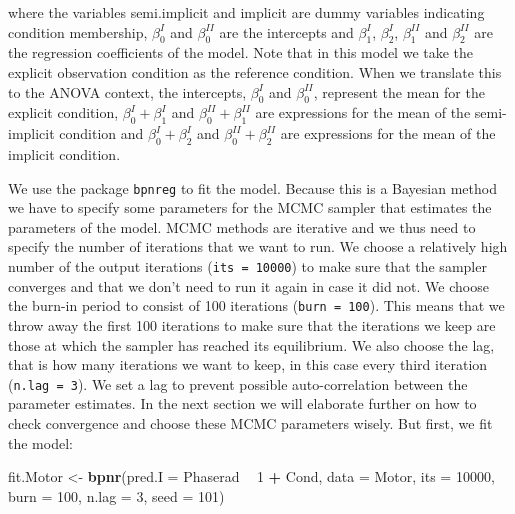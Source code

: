 \documentclass[11pt,]{article}
\newenvironment{Shaded}{\begin{snugshade}}{\end{snugshade}}
\newcommand{\DataTypeTok}[1]{\textcolor[rgb]{0.13,0.29,0.53}{#1}}
\newcommand{\DecValTok}[1]{\textcolor[rgb]{0.00,0.00,0.81}{#1}}
\newcommand{\KeywordTok}[1]{\textcolor[rgb]{0.13,0.29,0.53}{\textbf{#1}}}
\newcommand{\NormalTok}[1]{#1}
\newcommand{\OperatorTok}[1]{\textcolor[rgb]{0.81,0.36,0.00}{\textbf{#1}}}
\newcommand{\StringTok}[1]{\textcolor[rgb]{0.31,0.60,0.02}{#1}}
\begin{document}
where the variables semi.implicit and implicit are dummy variables
indicating condition membership, \(\beta_{0}^{I}\) and
\(\beta_{0}^{II}\) are the intercepts and \(\beta_{1}^{I}\),
\(\beta_{2}^{I}\), \(\beta_{1}^{II}\) and \(\beta_{2}^{II}\) are the
regression coefficients of the model. Note that in this model we take
the explicit observation condition as the reference condition. When we
translate this to the ANOVA context, the intercepts, \(\beta_{0}^{I}\)
and \(\beta_{0}^{II}\), represent the mean for the explicit condition,
\(\beta_{0}^{I} + \beta_{1}^{I}\) and
\(\beta_{0}^{II} + \beta_{1}^{II}\) are expressions for the mean of the
semi-implicit condition and \(\beta_{0}^{I} + \beta_{2}^{I}\) and
\(\beta_{0}^{II} + \beta_{2}^{II}\) are expressions for the mean of the
implicit condition.

We use the package \verb|bpnreg| to fit the model. Because this is a
Bayesian method we have to specify some parameters for the MCMC sampler
that estimates the parameters of the model. MCMC methods are iterative
and we thus need to specify the number of iterations that we want to
run. We choose a relatively high number of the output iterations
(\verb|its = 10000|) to make sure that the sampler converges and that we
don't need to run it again in case it did not. We choose the burn-in
period to consist of 100 iterations (\verb|burn = 100|). This means that
we throw away the first 100 iterations to make sure that the iterations
we keep are those at which the sampler has reached its equilibrium. We
also choose the lag, that is how many iterations we want to keep, in
this case every third iteration (\verb|n.lag = 3|). We set a lag to
prevent possible auto-correlation between the parameter estimates. In
the next section we will elaborate further on how to check convergence
and choose these MCMC parameters wisely. But first, we fit the model:

\begin{Shaded}
\begin{Highlighting}[]
\NormalTok{fit.Motor <-}\StringTok{ }\KeywordTok{bpnr}\NormalTok{(}\DataTypeTok{pred.I =}\NormalTok{ Phaserad }\OperatorTok{~}\StringTok{ }\DecValTok{1} \OperatorTok{+}\StringTok{ }\NormalTok{Cond, }\DataTypeTok{data =}\NormalTok{ Motor,}
                  \DataTypeTok{its =} \DecValTok{10000}\NormalTok{, }\DataTypeTok{burn =} \DecValTok{100}\NormalTok{, }\DataTypeTok{n.lag =} \DecValTok{3}\NormalTok{, }\DataTypeTok{seed =} \DecValTok{101}\NormalTok{)}
\end{Highlighting}
\end{Shaded}
\end{document}
